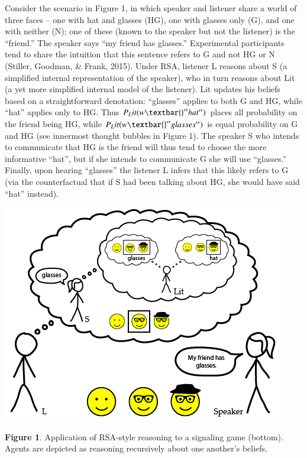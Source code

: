 \documentclass[]{elsarticle}
\begin{document}
Consider the scenario in Figure 1, in which speaker and listener share a
world of three faces -- one with hat and glasses (HG), one with glasses
only (G), and one with neither (N); one of these (known to the speaker
but not the listener) is the ``friend.'' The speaker says ``my friend
has glasses.'' Experimental participants tend to share the intuition
that this sentence refers to G and not HG or N (Stiller, Goodman, \&
Frank, 2015). Under RSA, listener L reasons about S (a simplified
internal representation of the speaker), who in turn reasons about Lit
(a yet more simplified internal model of the listener). Lit updates his
beliefs based on a straightforward denotation: ``glasses'' applies to
both G and HG, while ``hat'' applies only to HG. Thus
$P_Lit(w\textbar{}''hat'')$ places all probability on the friend
being HG, while $P_Lit(w\textbar{}''glasses'')$ is equal probability
on G and HG (see innermost thought bubbles in Figure 1). The speaker S
who intends to communicate that HG is the friend will thus tend to
choose the more informative ``hat'', but if she intends to communicate G
she will use ``glasses.'' Finally, upon hearing ``glasses'' the listener
L infers that this likely refers to G (via the counterfactual that if S
had been talking about HG, she would have said ``hat'' instead).

\includegraphics{images/media/image02.png}

\textbf{Figure 1}. Application of RSA-style reasoning to a signaling
game (bottom). Agents are depicted as reasoning recursively about one
another's beliefs.
\end{document}
